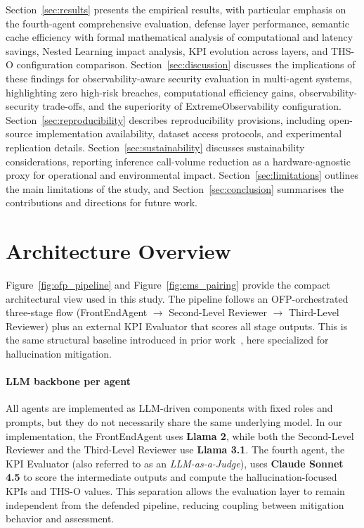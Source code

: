 \documentclass[11pt,a4paper]{article}
\begin{document}
	Section~\ref{sec:results} presents the empirical results, with particular emphasis on the fourth-agent comprehensive evaluation, defense layer performance, semantic cache efficiency with formal mathematical analysis of computational and latency savings, Nested Learning impact analysis, KPI evolution across layers, and THS-O configuration comparison. Section~\ref{sec:discussion} discusses the implications of these findings for observability-aware security evaluation in multi-agent systems, highlighting zero high-risk breaches, computational efficiency gains, observability-security trade-offs, and the superiority of ExtremeObservability configuration. Section~\ref{sec:reproducibility} describes reproducibility provisions, including open-source implementation availability, dataset access protocols, and experimental replication details. Section~\ref{sec:sustainability} discusses sustainability considerations, reporting inference call-volume reduction as a hardware-agnostic proxy for operational and environmental impact. Section~\ref{sec:limitations} outlines the main limitations of the study, and Section~\ref{sec:conclusion} summarises the contributions and directions for future work.
	
	\section{Architecture Overview}
	\label{sec:architecture}
	
	Figure~\ref{fig:ofp_pipeline} and Figure~\ref{fig:cms_pairing} provide the compact architectural view used in this study. The pipeline follows an OFP-orchestrated three-stage flow (FrontEndAgent \(\rightarrow\) Second-Level Reviewer \(\rightarrow\) Third-Level Reviewer) plus an external KPI Evaluator that scores all stage outputs. This is the same structural baseline introduced in prior work~\cite{gosmar2026promptinjectionmitigationagentic}, here specialized for hallucination mitigation.
	\paragraph{LLM backbone per agent}
	All agents are implemented as LLM-driven components with fixed roles and prompts, but they do not necessarily share the same underlying model.
	In our implementation, the FrontEndAgent uses \textbf{Llama 2}, while both the Second-Level Reviewer and the Third-Level Reviewer use \textbf{Llama 3.1}.
	The fourth agent, the KPI Evaluator (also referred to as an \emph{LLM-as-a-Judge}), uses \textbf{Claude Sonnet 4.5} \cite{anthropic2025claude} to score the intermediate outputs and compute the hallucination-focused KPIs and THS-O values.
	This separation allows the evaluation layer to remain independent from the defended pipeline, reducing coupling between mitigation behavior and assessment. 
\end{document}
